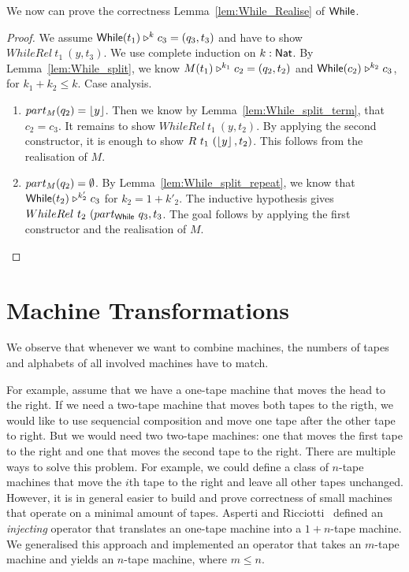 We now can prove the correctness Lemma~\ref{lem:While_Realise} of $\textsf{While}$.
\begin{proof}
  We assume $\textsf{While}(t_1) \mathrel{\triangleright}^k c_3=(q_3, t_3)$ and have to show $WhileRel~t_1~(y, t_3)$.  We use complete induction on $k:\textsf{Nat}$.  By
  Lemma~\ref{lem:While_split}, we know $M(t_1) \mathrel{\triangleright}^{k_1} c_2=(q_2, t_2)$ and $\textsf{While}(c_2) \mathrel{\triangleright}^{k_2} c_3$, for $k_1+k_2 \leq k$.  Case
  analysis.
  \begin{enumerate}
  \item $part_M(q_2) = \left\lfloor {y} \right\rfloor$.  Then we know by Lemma~\ref{lem:While_split_term}, that $c_2=c_3$.  It remains to show $WhileRel~t_1~(y, t_2)$.  By
    applying the second constructor, it is enough to show $R~t_1~(\left\lfloor {y} \right\rfloor, t_2)$.  This follows from the realisation of $M$.
  \item $part_M(q_2) = \emptyset$.  By Lemma~\ref{lem:While_split_repeat}, we know that $\textsf{While}(t_2) \mathrel{\triangleright}^{k'_2} c_3$ for $k_2 = 1 + k'_2$.  The
    inductive hypothesis gives $WhileRel~t_2~(part_{\textsf{While}}~q_3, t_3$.  The goal follows by applying the first constructor and the realisation of $M$.
  \end{enumerate}
\end{proof}







\section{Machine Transformations}
\label{sec:transformations}

We observe that whenever we want to combine machines, the numbers of tapes and alphabets of all involved machines have to match.

For example, assume that we have a one-tape machine that moves the head to the right.  If we need a two-tape machine that moves both tapes to the
rigth, we would like to use sequencial composition and move one tape after the other tape to right.  But we would need two two-tape machines: one that
moves the first tape to the right and one that moves the second tape to the right.  There are multiple ways to solve this problem.  For example, we
could define a class of $n$-tape machines that move the $i$th tape to the right and leave all other tapes unchanged.  However, it is in general easier
to build and prove correctness of small machines that operate on a minimal amount of tapes.  Asperti and Ricciotti~\cite{asperti2015} defined an
\emph{injecting} operator that translates an one-tape machine into a $1+n$-tape machine.  We generalised this approach and implemented an operator
that takes an $m$-tape machine and yields an $n$-tape machine, where $m \le n$.

